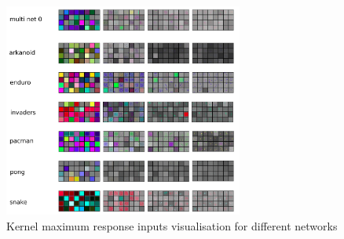 \documentclass[10pt,a4paper]{article}
\begin{document}
\begin{figure}[htb!]
\centering
\includegraphics[width=0.7\textwidth]{results/activity/kernel_features_desc.png}
\caption{Kernel maximum response inputs visualisation for different networks}
\end{figure}


\iffalse
\end{document}
